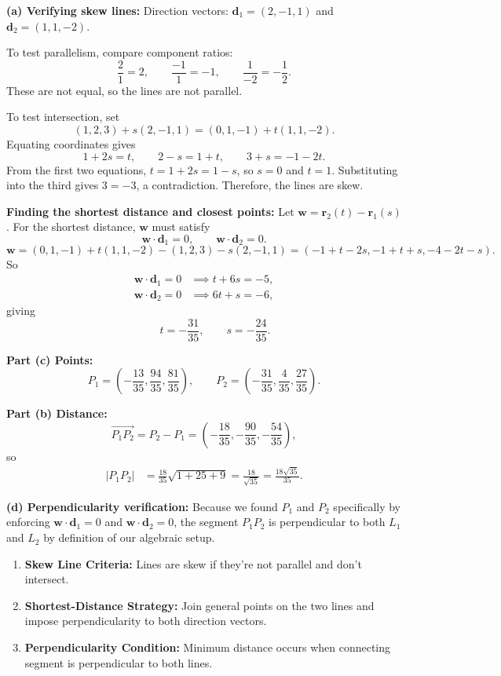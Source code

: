 \begin{solution}
\textbf{(a) Verifying skew lines:}
Direction vectors: $\mathbf{d}_1 = (2, -1, 1)$ and $\mathbf{d}_2 = (1, 1, -2)$.

To test parallelism, compare component ratios:
\[
\frac{2}{1} = 2,\qquad \frac{-1}{1} = -1,\qquad \frac{1}{-2} = -\frac12.
\]
These are not equal, so the lines are not parallel.

To test intersection, set
\[
(1, 2, 3) + s(2, -1, 1) = (0, 1, -1) + t(1, 1, -2).
\]
Equating coordinates gives
\[
1+2s=t,\qquad 2-s=1+t,\qquad 3+s=-1-2t.
\]
From the first two equations, $t=1+2s=1-s$, so $s=0$ and $t=1$. Substituting into the third gives $3=-3$, a contradiction. Therefore, the lines are skew.

\textbf{Finding the shortest distance and closest points:}
Let $\mathbf{w} = \mathbf{r}_2(t) - \mathbf{r}_1(s)$. For the shortest distance, $\mathbf{w}$ must satisfy
\[
\mathbf{w}\cdot \mathbf{d}_1 = 0,
\qquad
\mathbf{w}\cdot \mathbf{d}_2 = 0.
\]
\[
\mathbf{w} = (0, 1, -1) + t(1, 1, -2) - (1, 2, 3) - s(2, -1, 1)
= (-1 + t - 2s, -1 + t + s, -4 - 2t - s).
\]
So
\begin{align*}
\mathbf{w}\cdot \mathbf{d}_1 = 0 &\implies t + 6s = -5,\\
\mathbf{w}\cdot \mathbf{d}_2 = 0 &\implies 6t + s = -6,
\end{align*}
giving
\[
\qquad t = -\frac{31}{35},\qquad s = -\frac{24}{35}.
\]

\textbf{Part (c) Points:}
\[
P_1 = \left(-\frac{13}{35}, \frac{94}{35}, \frac{81}{35}\right),\qquad
P_2 = \left(-\frac{31}{35}, \frac{4}{35}, \frac{27}{35}\right).
\]

\textbf{Part (b) Distance:}
\[
\overrightarrow{P_1P_2}=P_2-P_1
= \left(-\frac{18}{35}, -\frac{90}{35}, -\frac{54}{35}\right),
\]
so
\begin{align*}
|P_1P_2|
&= \frac{18}{35}\sqrt{1+25+9}
= \frac{18}{\sqrt{35}}
= \frac{18\sqrt{35}}{35}.
\end{align*}

\textbf{(d) Perpendicularity verification:}
Because we found $P_1$ and $P_2$ specifically by enforcing $\mathbf{w} \cdot \mathbf{d}_1 = 0$ and $\mathbf{w} \cdot \mathbf{d}_2 = 0$, the segment $P_1P_2$ is perpendicular to both $L_1$ and $L_2$ by definition of our algebraic setup.
\end{solution}

\begin{takeaways}
\begin{enumerate}
    \item \textbf{Skew Line Criteria:} Lines are skew if they're not parallel and don't intersect.
    \item \textbf{Shortest-Distance Strategy:} Join general points on the two lines and impose perpendicularity to both direction vectors.
    \item \textbf{Perpendicularity Condition:} Minimum distance occurs when connecting segment is perpendicular to both lines.
\end{enumerate}
\end{takeaways}

